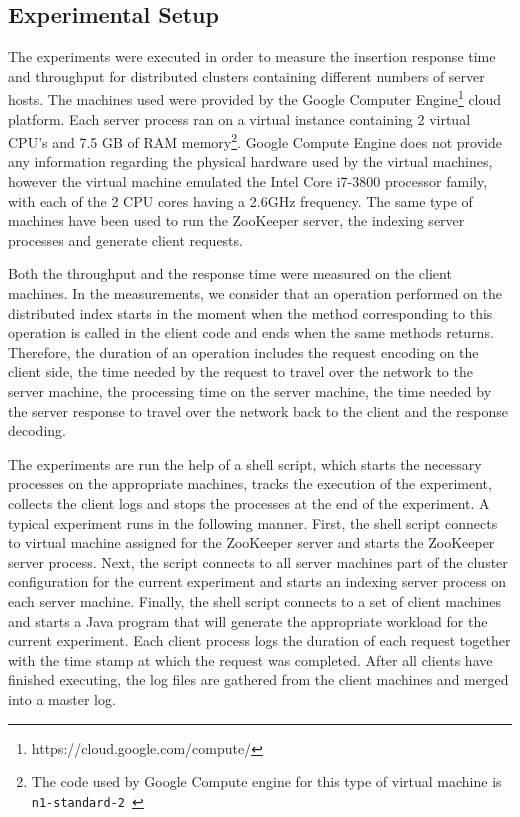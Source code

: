 \documentclass[11pt,a4paper]{globis-book}
\begin{document}
\subsection{Experimental Setup}
The experiments were executed in order to measure the insertion response time and throughput for distributed clusters containing different numbers of server hosts. The machines used were provided by the Google Computer Engine\footnote{https://cloud.google.com/compute/} cloud platform. Each server process ran on a virtual instance containing 2 virtual CPU's and 7.5 GB of RAM memory\footnote{The code used by Google Compute engine for this type of virtual machine is \texttt{n1-standard-2 }}. Google Compute Engine does not provide any information regarding the physical hardware used by the virtual machines, however the virtual machine emulated the Intel Core i7-3800 processor family, with each of the 2 CPU cores having a 2.6GHz frequency. The same type of machines have been used to run the ZooKeeper server, the indexing server processes and generate client requests. 

Both the throughput and the response time were measured on the client machines. In the measurements, we consider that an operation performed on the distributed index starts in the moment when the method corresponding to this operation is called in the client code and ends when the same methods returns. Therefore, the duration of an operation includes the request encoding on the client side, the time needed by the request to travel over the network to the server machine, the processing time on the server machine, the time needed by the server response to travel over the network back to the client and the response decoding. 

The experiments are run the help of a shell script, which starts the necessary processes on the appropriate machines, tracks the execution of the experiment, collects the client logs and stops the processes at the end of the experiment. A typical experiment runs in the following manner. First, the shell script connects to virtual machine assigned for the ZooKeeper server and starts the ZooKeeper server process. Next, the script connects to all server machines part of the cluster configuration for the current experiment and starts an indexing server process on each server machine. Finally, the shell script connects to a set of client machines and starts a Java program that will generate the appropriate workload for the current experiment. Each client process logs the duration of each request together with the time stamp at which the request was completed. After all clients have finished executing, the log files are gathered from the client machines and merged into a master log. 
\end{document}
